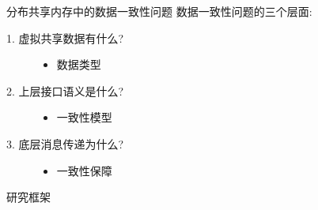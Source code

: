 \begin{frame}{分布共享内存中的数据一致性问题}
      数据一致性问题的三个层面: 
      \begin{description}
	\item[1. 虚拟共享数据有什么?]
	  \begin{itemize}
	    \item 数据类型
	  \end{itemize}
	\item[2. 上层接口语义是什么?]
	  \begin{itemize}
	    \item 一致性模型
	  \end{itemize}
	\item[3. 底层消息传递为什么?]
	  \begin{itemize}
	    \item 一致性保障
	  \end{itemize}
      \end{description}
\end{frame}
\begin{frame}{研究框架}
\end{frame}
